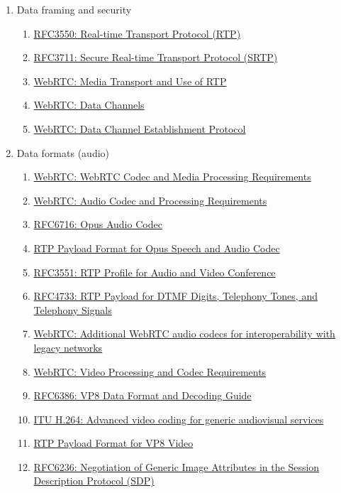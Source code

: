 \documentclass{acmtog} %
\begin{document}
\begin{enumerate}
\item Data framing and security
    \begin{enumerate}
    \item \href{https://tools.ietf.org/html/rfc3550}{RFC3550: Real-time Transport Protocol (RTP)}
    \item \href{https://tools.ietf.org/html/rfc3711}{RFC3711: Secure Real-time Transport Protocol (SRTP)}
    \item \href{https://tools.ietf.org/html/draft-ietf-rtcweb-rtp-usage-23}{WebRTC: Media Transport and Use of RTP}
    \item \href{https://tools.ietf.org/html/draft-ietf-rtcweb-data-channel-13}{WebRTC: Data Channels}
    \item \href{https://tools.ietf.org/html/draft-ietf-rtcweb-data-protocol-09}{WebRTC: Data Channel Establishment Protocol}
    \end{enumerate}
\item Data formats (audio)
    \begin{enumerate}
    \item \href{https://tools.ietf.org/html/draft-cbran-rtcweb-codec-02}{WebRTC: WebRTC Codec and Media Processing Requirements}
    \item \href{https://tools.ietf.org/html/draft-ietf-rtcweb-audio-07}{WebRTC: Audio Codec and Processing Requirements}
    \item \href{https://tools.ietf.org/html/rfc6716}{RFC6716: Opus Audio Codec}
    \item \href{https://tools.ietf.org/html/draft-ietf-payload-rtp-opus-11}{RTP Payload Format for Opus Speech and Audio Codec}
    \item \href{https://tools.ietf.org/html/rfc3551}{RFC3551: RTP Profile for Audio and Video Conference}
    \item \href{https://tools.ietf.org/html/rfc4733}{RFC4733: RTP Payload for DTMF Digits, Telephony Tones, and Telephony Signals}
    \item \href{https://tools.ietf.org/html/draft-ietf-rtcweb-audio-codecs-for-interop-01}{WebRTC: Additional WebRTC audio codecs for interoperability with legacy networks}
    \item \href{https://tools.ietf.org/html/draft-ietf-rtcweb-video-05}{WebRTC: Video Processing and Codec Requirements}
    \item \href{https://tools.ietf.org/html/rfc6386}{RFC6386: VP8 Data Format and Decoding Guide}
    \item \href{http://www.itu.int/rec/T-REC-H.264}{ITU H.264: Advanced video coding for generic audiovisual services}
    \item \href{https://tools.ietf.org/html/draft-ietf-payload-vp8-15}{RTP Payload Format for VP8 Video}
    \item \href{https://tools.ietf.org/html/rfc6236}{RFC6236: Negotiation of Generic Image Attributes in the Session Description Protocol (SDP)}
    \end{enumerate}


\end{enumerate}
\end{document}
